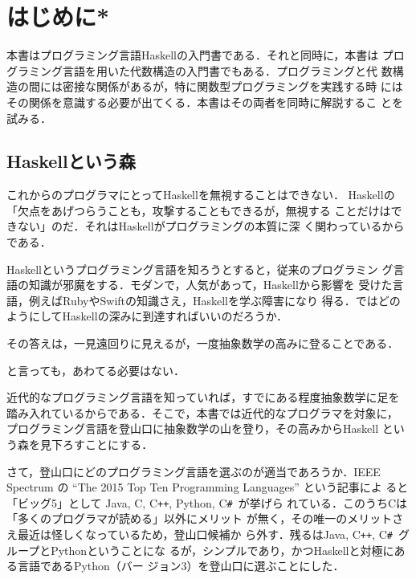 \documentclass[a5paper,twoside,fleqn,draft]{jsbook}
\newcommand{\programminglanguage}[1]{\textsf{#1}}
\newcommand{\clang}{\programminglanguage{C}}
\newcommand{\csharp}{\programminglanguage{C}\texttt{\#}}
\newcommand{\cxx}{\programminglanguage{C}\texttt{++}}
\newcommand{\haskell}{\programminglanguage{Haskell}}
\newcommand{\java}{\programminglanguage{Java}}
\newcommand{\python}{\programminglanguage{Python}}
\newcommand{\ruby}{\programminglanguage{Ruby}}
\newcommand{\swift}{\programminglanguage{Swift}}
\newenvironment{leader}{\begingroup\gt}{\endgroup}
\begin{document}
\chapter{はじめに*}
\label{ch:introduction}

\begin{leader}
本書はプログラミング言語\haskell の入門書である．それと同時に，本書は
プログラミング言語を用いた代数構造の入門書でもある．プログラミングと代
数構造の間には密接な関係があるが，特に関数型プログラミングを実践する時
にはその関係を意識する必要が出てくる．本書はその両者を同時に解説するこ
とを試みる．
\end{leader}

\section{\haskell という森}

これからのプログラマにとって\haskell を無視することはできない．
\haskell の「欠点をあげつらうことも，攻撃することもできるが，無視する
  ことだけはできない」のだ．それは\haskell がプログラミングの本質に深
く関わっているからである．

\haskell というプログラミング言語を知ろうとすると，従来のプログラミン
グ言語の知識が邪魔をする．モダンで，人気があって，\haskell から影響を
受けた言語，例えば\ruby や\swift の知識さえ，\haskell を学ぶ障害になり
得る．ではどのようにして\haskell の深みに到達すればいいのだろうか．

その答えは，一見遠回りに見えるが，一度抽象数学の高みに登ることである．

と言っても，あわてる必要はない．

近代的なプログラミング言語を知っていれば，すでにある程度抽象数学に足を
踏み入れているからである．そこで，本書では近代的なプログラマを対象に，
プログラミング言語を登山口に抽象数学の山を登り，その高みから\haskell
という森を見下ろすことにする．


さて，登山口にどのプログラミング言語を選ぶのが適当であろうか．IEEE
Spectrum の ``The 2015 Top Ten Programming Languages'' という記事によ
ると「ビッグ5」として \java, \clang, \cxx, \python, \csharp\ が挙げら
れている．このうち\clang は「多くのプログラマが読める」以外にメリット
が無く，その唯一のメリットさえ最近は怪しくなっているため，登山口候補か
ら外す．残るは\java, \cxx, \csharp\ グループと\python ということにな
るが，シンプルであり，かつ\haskell と対極にある言語である\python（バー
  ジョン3）を登山口に選ぶことにした．
\end{document}

